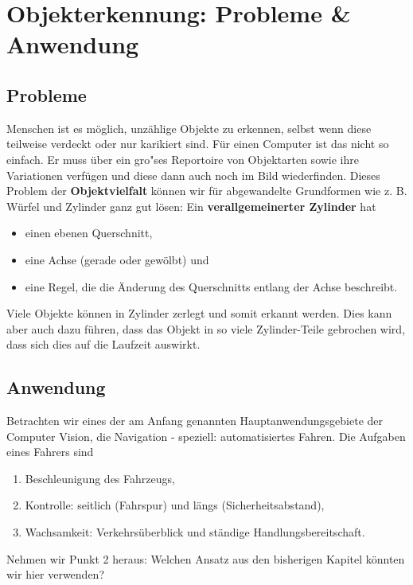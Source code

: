 \section{Objekterkennung: Probleme \& Anwendung}


\subsection{Probleme}

Menschen ist es möglich, unzählige Objekte zu erkennen, selbst wenn diese teilweise verdeckt oder nur karikiert sind. Für einen Computer ist das nicht so einfach. Er muss über ein gro"ses Reportoire von Objektarten sowie ihre Variationen verfügen und diese dann auch noch im Bild wiederfinden. Dieses Problem der \textbf{Objektvielfalt} können wir für abgewandelte Grundformen wie z. B. Würfel und Zylinder ganz gut lösen: Ein \textbf{verallgemeinerter Zylinder} \label{Zylinder} hat
\begin{itemize}
\item einen ebenen Querschnitt,
\item eine Achse (gerade oder gewölbt) und
\item eine Regel, die die Änderung des Querschnitts entlang der Achse beschreibt.
\end{itemize}
Viele Objekte können in Zylinder zerlegt und somit erkannt werden. Dies kann aber auch dazu führen, dass das Objekt in so viele Zylinder-Teile gebrochen wird, dass sich dies auf die Laufzeit auswirkt.

\subsection{Anwendung}
Betrachten wir eines der am Anfang genannten Hauptanwendungsgebiete der Computer Vision, die Navigation - speziell: automatisiertes Fahren. Die Aufgaben eines Fahrers sind
\begin{enumerate}
\item Beschleunigung des Fahrzeugs,
\item Kontrolle: seitlich (Fahrspur) und längs (Sicherheitsabstand),
\item Wachsamkeit: Verkehrsüberblick und ständige Handlungsbereitschaft.
\end{enumerate}
Nehmen wir Punkt 2 heraus: Welchen Ansatz aus den bisherigen Kapitel könnten wir hier verwenden?

